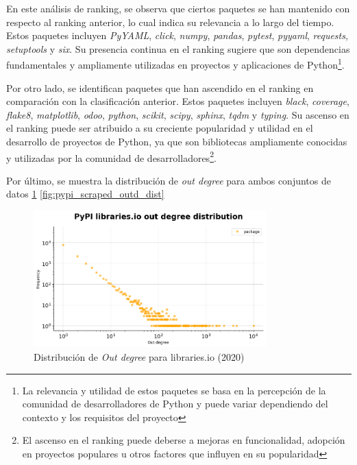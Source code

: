 En este análisis de ranking, se observa que ciertos paquetes se han mantenido con respecto al ranking
anterior, lo cual indica su relevancia a lo largo del tiempo. Estos
paquetes incluyen \textit{PyYAML}, \textit{click}, \textit{numpy}, \textit{pandas}, \textit{pytest},
\textit{pyyaml}, \textit{requests}, \textit{setuptools} y \textit{six}. Su presencia continua en el
ranking sugiere que son dependencias fundamentales y ampliamente utilizadas en proyectos y aplicaciones
de Python\footnote{La relevancia y utilidad de estos paquetes se basa en la percepción de la comunidad
    de desarrolladores de Python y puede variar dependiendo del contexto y los requisitos del proyecto}.

Por otro lado, se identifican paquetes que han ascendido en el ranking en comparación con la clasificación
anterior. Estos paquetes incluyen \textit{black}, \textit{coverage}, \textit{flake8}, \textit{matplotlib},
\textit{odoo}, \textit{python}, \textit{scikit}, \textit{scipy}, \textit{sphinx}, \textit{tqdm} y
\textit{typing}. Su ascenso en el ranking puede ser atribuido a su creciente popularidad y utilidad en el
desarrollo de proyectos de Python, ya que son bibliotecas ampliamente conocidas y utilizadas por la
comunidad de desarrolladores\footnote{El ascenso en el ranking puede deberse a mejoras en funcionalidad,
    adopción en proyectos populares u otros factores que influyen en su popularidad}.

Por último, se muestra la distribución de \textit{out degree} para ambos conjuntos de datos \ref{fig:pypi_libio_outd_dist} \ref{fig:pypi_scraped_outd_dist}

\begin{figure}[ht!]
    \begin{center}
        \includegraphics[width=0.8\textwidth]{img/pypi/outd_libio_dist.png}
        \caption{Distribución de \textit{Out degree} para libraries.io (2020)}
        \label{fig:pypi_libio_outd_dist}
    \end{center}
\end{figure}

